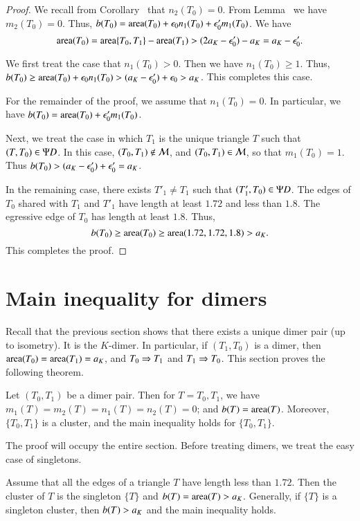 \begin{proof}
We recall from Corollary~ that $n_2(T_0)=0$.  From Lemma~ we
have $m_2(T_0)=0$.  Thus, $b(T_0) = {\operatorname{area}}(T_0) + \epsilon_0 n_1(T_0) + \epsilon_0' m_1(T_0)$.
We have
\[
{\operatorname{area}}(T_0) = {\operatorname{area}}\{T_0,T_1\} - {\operatorname{area}}(T_1) > (2a_K-\epsilon_0') -a_K = a_K - \epsilon_0'.
\]

We first treat the case that $n_1(T_0)>0$.  Then we have $n_1(T_0)\ge 1$.
Thus, $b(T_0) \ge {\operatorname{area}}(T_0) + \epsilon_0 n_1(T_0) > (a_K - \epsilon_0') + \epsilon_0 > a_K$.
This completes this case.  

For the remainder of the proof, we assume that $n_1(T_0)=0$.  In particular, we have
$b(T_0) = {\operatorname{area}}(T_0) + \epsilon_0' m_1(T_0)$.

Next, we treat the case in which $T_1$ is the unique triangle $T$ such that $(T,T_0)\in\Psi D$.
In this case, $(T_0,T_1)\not\in\mathcal M$, and $(T_0,T_1)\in\mathcal M$, so that $m_1(T_0)=1$.  Thus
$b(T_0) > (a_K-\epsilon_0') + \epsilon_0' = a_K$.

In the remaining case, there exists $T'_1\ne T_1$ such that $(T'_1,T_0)\in\Psi D$.  The edges of
$T_0$ shared with $T_1$ and $T'_1$ have length at least $1.72$ and less than $1.8$.  The
egressive edge of $T_0$ has length at least $1.8$.  Thus,
\[
b(T_0) \ge {\operatorname{area}} (T_0) \ge {\operatorname{area}}(1.72,1.72,1.8) > a_K.
\]
This completes the proof.
\end{proof}


\section{Main inequality for dimers}

Recall that
the previous section shows that there exists a unique dimer pair (up to isometry).
It is the $K$-dimer.  In particular, if $(T_1,T_0)$ is a dimer, then 
${\operatorname{area}}(T_0)={\operatorname{area}}(T_1)=a_K$, and $T_0\Rightarrow T_1$ and $T_1\Rightarrow T_0$.
This section proves the following theorem.

\begin{theorem} Let $(T_0,T_1)$ be a dimer pair.  Then for $T=T_0,T_1$,
we have $m_1(T)=m_2(T) = n_1(T)=n_2(T) = 0$; and $b(T) = {\operatorname{area}}(T)$.
Moreover, $\{T_0,T_1\}$ is a cluster, and the main inequality holds for
$\{T_0,T_1\}$.
\end{theorem}

The proof will occupy the entire section.  Before treating dimers, we treat the
easy case of singletons.

\begin{lemma}  Assume that all the edges of a triangle $T$ have length less than $1.72$.
Then the cluster of $T$ is the singleton $\{T\}$ and $b(T) ={\operatorname{area}}(T) > a_K$.  Generally,
if $\{T\}$ is a singleton cluster, then $b(T) > a_K$ and the main inequality holds.
\end{lemma}

